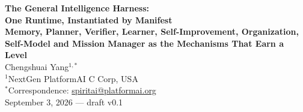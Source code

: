 \documentclass[11pt]{article}
\theoremstyle{definition}
\begin{document}
\begin{center}
{\LARGE\bfseries The General Intelligence Harness:}\\[6pt]
{\LARGE\bfseries One Runtime, Instantiated by Manifest}\\[8pt]
{\large\bfseries Memory, Planner, Verifier, Learner, Self-Improvement, Organization,\\[2pt]
Self-Model and Mission Manager as the Mechanisms That Earn a Level}\\[16pt]
{\large Chengshuai Yang$^{1,*}$}\\[5pt]
{\normalsize $^{1}$NextGen PlatformAI C Corp, USA}\\[4pt]
{\normalsize $^{*}$Correspondence: \href{mailto:spiritai@platformai.org}{spiritai@platformai.org}}\\[10pt]
{\small September 3, 2026 --- draft v0.1}
\end{center}
\end{document}

